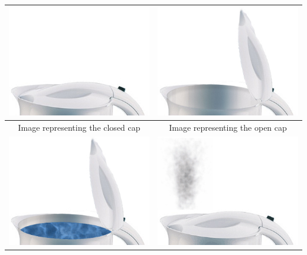 \begin{table}[h!]
\begin{center}
    \begin{tabular}{ | c | c |}
    \hline
	\includegraphics{img/tutorial/tut_04_capclosed.jpg} & \includegraphics{img/tutorial/tut_04_capopen.jpg} \\ \hline
	Image representing the closed cap & Image representing the open cap  \\ \hline
	\includegraphics{img/tutorial/tut_04_capfull.jpg} & \includegraphics{img/tutorial/tut_04_capon.jpg} \\ \hline

\end{tabular}
\end{center}
\end{table}
